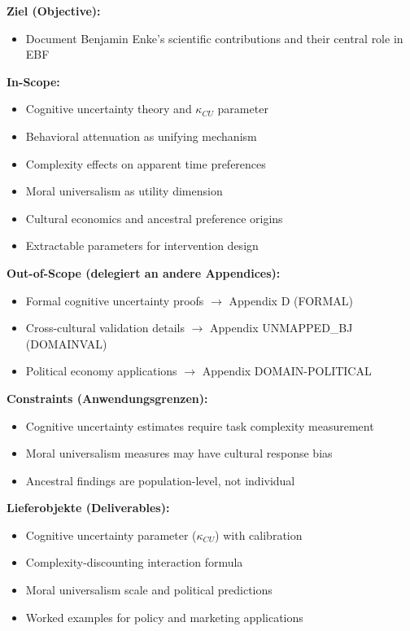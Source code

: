 \begin{tcolorbox}[
    colback=orange!5!white,
    colframe=orange!75!black,
    title={\textbf{Appendix Scope: Ziel / In-Scope / Out-of-Scope / Constraints}},
    fonttitle=\bfseries
]

\textbf{Ziel (Objective):}
\begin{itemize}[nosep]
    \item Document Benjamin Enke's scientific contributions and their central role in EBF
\end{itemize}

\textbf{In-Scope:}
\begin{itemize}[nosep]
    \item Cognitive uncertainty theory and $\kappa_{CU}$ parameter
    \item Behavioral attenuation as unifying mechanism
    \item Complexity effects on apparent time preferences
    \item Moral universalism as utility dimension
    \item Cultural economics and ancestral preference origins
    \item Extractable parameters for intervention design
\end{itemize}

\textbf{Out-of-Scope (delegiert an andere Appendices):}
\begin{itemize}[nosep]
    \item Formal cognitive uncertainty proofs $\rightarrow$ Appendix D (FORMAL)
    \item Cross-cultural validation details $\rightarrow$ Appendix UNMAPPED_BJ (DOMAINVAL)
    \item Political economy applications $\rightarrow$ Appendix DOMAIN-POLITICAL
\end{itemize}

\textbf{Constraints (Anwendungsgrenzen):}
\begin{itemize}[nosep]
    \item Cognitive uncertainty estimates require task complexity measurement
    \item Moral universalism measures may have cultural response bias
    \item Ancestral findings are population-level, not individual
\end{itemize}

\textbf{Lieferobjekte (Deliverables):}
\begin{itemize}[nosep]
    \item Cognitive uncertainty parameter ($\kappa_{CU}$) with calibration
    \item Complexity-discounting interaction formula
    \item Moral universalism scale and political predictions
    \item Worked examples for policy and marketing applications
\end{itemize}

\end{tcolorbox}


